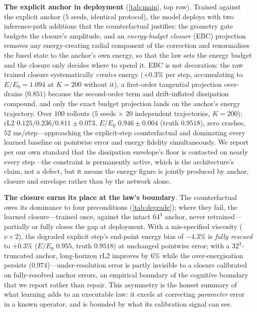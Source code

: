 \documentclass[11pt,a4paper]{article}
\begin{document}
\textbf{The explicit anchor in deployment} (\ref{tab:main}, top row). Trained against the explicit anchor ($5$ seeds, identical protocol), the model deploys with two inference-path additions that the counterfactual justifies: the geometry gate budgets the closure's amplitude, and an \emph{energy-budget closure} (EBC) projection removes any energy-creating radial component of the correction and renormalises the fused state to the anchor's own energy, so that the law sets the energy budget and the closure only decides where to spend it. EBC is not decoration: the raw trained closure systematically \emph{creates} energy ($+0.3\%$ per step, accumulating to $E/E_0{=}1.094$ at $K{=}200$ without it), a first-order tangential projection over-drains ($0.851$) because the second-order term and drift-inflated dissipation compound, and only the exact budget projection lands on the anchor's energy trajectory. Over $100$ rollouts ($5$ seeds $\times$ $20$ independent trajectories, $K{=}200$): rL2 $0.125/0.236/0.811\pm0.073$, $E/E_0$ $0.946\pm0.004$ (truth $0.9518$), zero crashes, $52$ ms/step---approaching the explicit-step counterfactual and dominating every learned baseline on pointwise error and energy fidelity simultaneously. We report per our own standard that the dissipation envelope's floor is contacted on nearly every step---the constraint is permanently active, which is the architecture's claim, not a defect, but it means the energy figure is jointly produced by anchor, closure and envelope rather than by the network alone.

\textbf{The closure earns its place at the law's boundary}. The counterfactual owes its dominance to four preconditions (\ref{tab:degrade}); where they fail, the learned closure---trained once, against the intact $64^3$ anchor, never retrained---partially or fully closes the gap at deployment. With a mis-specified viscosity ($\nu{\times}2$), the degraded explicit step's end-point energy bias of $-4.3\%$ is \emph{fully rescued} to $+0.3\%$ ($E/E_0$ $0.955$, truth $0.9518$) at unchanged pointwise error; with a $32^3$-truncated anchor, long-horizon rL2 improves by $6\%$ while the over-energisation persists ($0.974$)---under-resolution error is partly invisible to a closure calibrated on fully-resolved anchor errors, an empirical boundary of the cognitive boundary that we report rather than repair. This asymmetry is the honest summary of what learning adds to an executable law: it excels at correcting \emph{parameter} error in a known operator, and is bounded by what its calibration signal can see.
\end{document}
